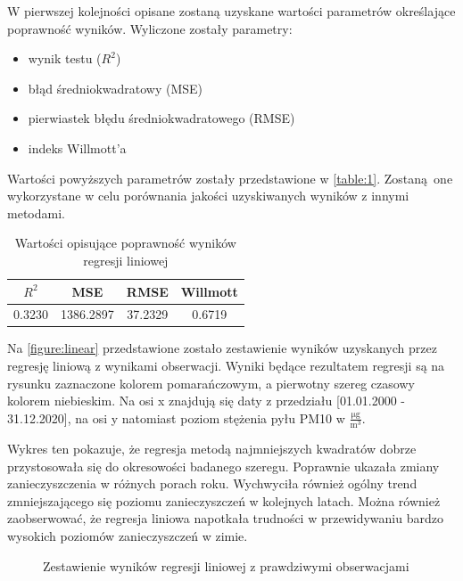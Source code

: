 \documentclass[10pt,a4paper]{article}
\begin{document}
W pierwszej kolejności opisane zostaną uzyskane wartości parametrów określające poprawność wyników. Wyliczone zostały parametry:
\begin{center}
	\begin{itemize}
		\item wynik testu ($R^2$)
		\item błąd średniokwadratowy (MSE)
		\item pierwiastek błędu średniokwadratowego (RMSE)
		\item indeks Willmott'a
	\end{itemize}
\end{center}
Wartości powyższych parametrów zostały przedstawione w \autoref{table:1}. Zostaną one wykorzystane w celu porównania jakości uzyskiwanych wyników z innymi metodami.
\begin{table}[h!]
	\centering
	\begin{tabular}{|c|c|c|c|}
		\hline
		$R^2$ & MSE & RMSE & Willmott \\
		\hline
		0.3230 &1386.2897 & 37.2329 & 0.6719 \\
		\hline
	\end{tabular}
		\caption{Wartości opisujące poprawność wyników regresji liniowej}
		\label{table:1}
\end{table}

Na \autoref{figure:linear} przedstawione zostało zestawienie wyników uzyskanych przez regresję liniową z wynikami obserwacji. Wyniki będące rezultatem regresji są na rysunku zaznaczone kolorem pomarańczowym, a pierwotny szereg czasowy kolorem niebieskim. Na osi x znajdują się daty z przedziału [01.01.2000 - 31.12.2020], na osi y natomiast poziom stężenia pyłu PM10 w $\frac{\si{\micro\gram}}{\si\meter^3}$. 

Wykres ten pokazuje, że regresja metodą najmniejszych kwadratów dobrze przystosowała się do okresowości badanego szeregu. Poprawnie ukazała zmiany zanieczyszczenia w różnych porach roku. Wychwyciła również ogólny trend zmniejszającego się poziomu zanieczyszczeń w kolejnych latach. Można również zaobserwować, że regresja liniowa napotkała trudności w przewidywaniu bardzo wysokich poziomów zanieczyszczeń w zimie. 

\begin{figure}[!ht]
	\centering
	\caption{Zestawienie wyników regresji liniowej z prawdziwymi obserwacjami}
	\label{figure:linear}
\end{figure}
\FloatBarrier
\end{document}
